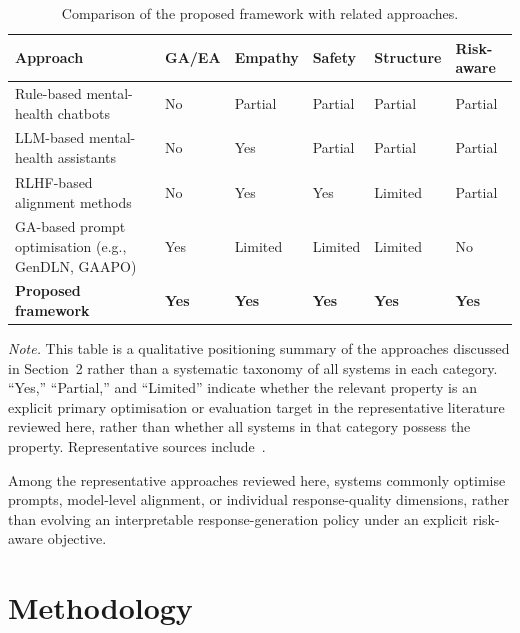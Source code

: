 \documentclass[mathematics,article,submit,xetex,moreauthors]{Definitions/mdpi}
\begin{document}
\begin{table}[H]
\centering
\small
\caption{Comparison of the proposed framework with related approaches.}
\label{tab:related-comparison}
\renewcommand{\arraystretch}{1.15}
\begin{tabularx}{\textwidth}{
  >{\raggedright\arraybackslash}X
  >{\centering\arraybackslash}p{1.45cm}
  >{\centering\arraybackslash}p{1.45cm}
  >{\centering\arraybackslash}p{1.45cm}
  >{\centering\arraybackslash}p{1.45cm}
  >{\centering\arraybackslash}p{1.45cm}
}
\toprule
\textbf{Approach} & \textbf{GA/EA} & \textbf{Empathy} &
\textbf{Safety} & \textbf{Structure} & \textbf{Risk-aware} \\
\midrule
Rule-based mental-health chatbots
  & No & Partial & Partial & Partial & Partial \\
LLM-based mental-health assistants
  & No & Yes & Partial & Partial & Partial \\
RLHF-based alignment methods
  & No & Yes & Yes & Limited & Partial \\
GA-based prompt optimisation (e.g., GenDLN, GAAPO)
  & Yes & Limited & Limited & Limited & No \\
\rowcolor{gray!10}\textbf{Proposed framework}
  & \textbf{Yes} & \textbf{Yes} & \textbf{Yes} & \textbf{Yes} & \textbf{Yes} \\
\bottomrule
\end{tabularx}
\end{table}

\textit{Note.} This table is a qualitative positioning summary of the
approaches discussed in Section~2 rather than a systematic taxonomy of all
systems in each category. ``Yes,'' ``Partial,'' and ``Limited'' indicate
whether the relevant property is an explicit primary optimisation or
evaluation target in the representative literature reviewed here, rather than
whether all systems in that category possess the property. Representative
sources include~\cite{jmir2024_empathic,when_llms_meet_ea2025,mles2026,
gendl2025,gaapo2025}.

Among the representative approaches reviewed here, systems commonly optimise
prompts, model-level alignment, or individual response-quality dimensions,
rather than evolving an interpretable response-generation policy under an
explicit risk-aware objective.

\section{Methodology}
\label{sec:methods}
\end{document}
